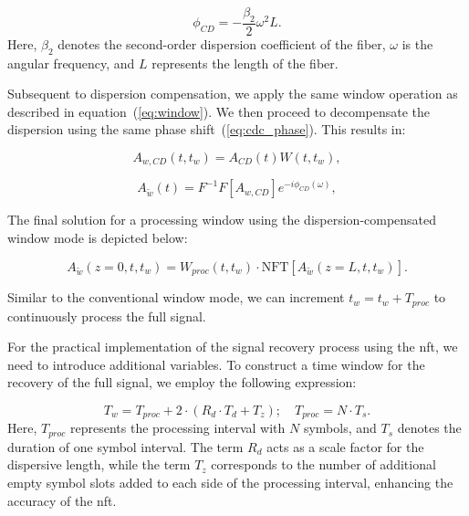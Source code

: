 \begin{equation}
\phi_{CD} = -\frac{\beta_2}{2} \omega^2 L {.}
\label{eq:cdc_phase}
\end{equation}
%
Here, $\beta_2$ denotes the second-order dispersion coefficient of the fiber, $\omega$ is the angular frequency, and $L$ represents the length of the fiber.

Subsequent to dispersion compensation, we apply the same window operation as described in equation~(\ref{eq:window}). We then proceed to decompensate the dispersion using the same phase shift~(\ref{eq:cdc_phase}). This results in:

\begin{equation}
A_{w, CD}(t, t_w) = A_{CD}(t) W(t, t_w) {,}
\end{equation}

\begin{equation}
A_{\tilde{w}}(t) = F^{-1}F[A_{w, CD}]e^{-i\phi_{CD}(\omega)} {,}
\end{equation}

The final solution for a processing window using the dispersion-compensated window mode is depicted below:

\begin{equation}
A_{\tilde{w}}(z = 0, t, t_w) = W_{proc}(t, t_w) \cdot \mathrm{NFT}[A_{\tilde{w}}(z = L, t, t_w)] {.}
\end{equation}

Similar to the conventional window mode, we can increment $t_w = t_w + T_{proc}$ to continuously process the full signal.

For the practical implementation of the signal recovery process using the \acrshort{nft}, we need to introduce additional variables. To construct a time window for the recovery of the full signal, we employ the following expression:

\begin{equation}
T_w = T_{proc} + 2 \cdot (R_d \cdot T_d + T_z) {;} \quad T_{proc} = N \cdot T_s {.}
\label{eq:t_window}
\end{equation}
%
Here, $T_{proc}$ represents the processing interval with $N$ symbols, and $T_s$ denotes the duration of one symbol interval. The term $R_d$ acts as a scale factor for the dispersive length, while the term $T_z$ corresponds to the number of additional empty symbol slots added to each side of the processing interval, enhancing the accuracy of the \acrshort{nft}.

